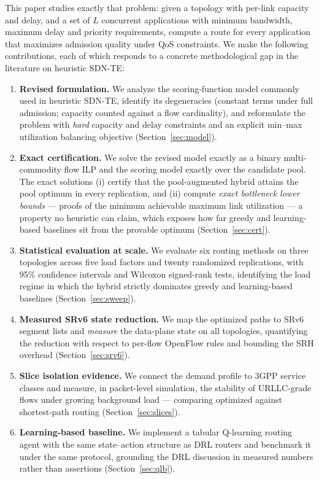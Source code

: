\documentclass[journal]{IEEEtran}
\begin{document}
This paper studies exactly that problem: given a topology with per-link
capacity and delay, and a set of $L$ concurrent applications with minimum
bandwidth, maximum delay and priority requirements, compute a route for
every application that maximizes admission quality under QoS constraints.
We make the following contributions, each of which responds to a concrete
methodological gap in the literature on heuristic SDN-TE:
\begin{enumerate}
\item \textbf{Revised formulation.} We analyze the scoring-function model
commonly used in heuristic SDN-TE, identify its degeneracies (constant terms
under full admission; capacity counted against a flow cardinality), and
reformulate the problem with \emph{hard} capacity and delay constraints and
an explicit min--max utilization balancing objective
(Section~\ref{sec:model}).
\item \textbf{Exact certification.} We solve the revised model exactly as a
binary multi-commodity flow ILP and the scoring model exactly over the
candidate pool. The exact solutions (i) certify that the pool-augmented
hybrid attains the pool optimum in every replication, and (ii) compute
\emph{exact bottleneck lower bounds} --- proofs of the minimum achievable
maximum link utilization --- a property no heuristic can claim, which
exposes how far greedy and learning-based baselines sit from the provable
optimum (Section~\ref{sec:cert}).
\item \textbf{Statistical evaluation at scale.} We evaluate six routing
methods on three topologies across five load factors and twenty randomized
replications, with 95\% confidence intervals and Wilcoxon signed-rank tests,
identifying the load regime in which the hybrid strictly dominates greedy
and learning-based baselines (Section~\ref{sec:sweep}).
\item \textbf{Measured SRv6 state reduction.} We map the optimized paths to
SRv6 segment lists \cite{rfc8402,rfc8754,rfc8986} and \emph{measure} the
data-plane state on all topologies, quantifying the reduction with respect
to per-flow OpenFlow rules and bounding the SRH overhead
(Section~\ref{sec:srv6}).
\item \textbf{Slice isolation evidence.} We connect the demand profile to
3GPP service classes \cite{itu-m2083,3gpp-ts23501} and measure, in
packet-level simulation, the stability of URLLC-grade flows under growing
background load --- comparing optimized against shortest-path routing
(Section~\ref{sec:slices}).
\item \textbf{Learning-based baseline.} We implement a tabular Q-learning
routing agent with the same state--action structure as DRL routers and
benchmark it under the same protocol, grounding the DRL discussion in
measured numbers rather than assertions (Section~\ref{sec:qlb}).
\end{enumerate}
\end{document}
